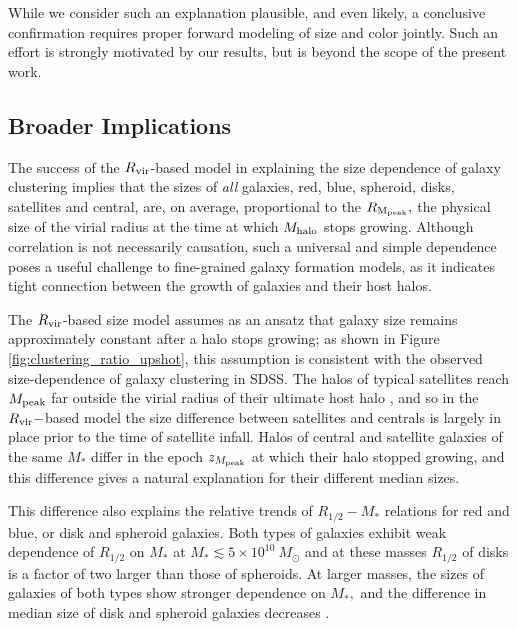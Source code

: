 \documentclass[usenatbib,usegraphicx,letterpaper]{mn2e}
\newcommand{\rhalf}{R_{1/2}}
\newcommand{\mstar}{M_{\ast}}
\newcommand{\mpeak}{M_{\rm peak}}
\newcommand{\zpeak}{z_{M_{\rm peak}}}
\newcommand{\mhalo}{M_{\rm halo}}
\newcommand{\rvir}{R_{\rm vir}}
\newcommand{\rmpeak}{R_{\rm M_{peak}}}
\begin{document}
While we consider such an explanation plausible, and even likely, a conclusive confirmation requires proper forward modeling of size and color jointly. Such an effort is strongly motivated by our results, but is beyond the scope of the present work.

\subsection{Broader Implications}
\label{subsec:broader_implications}

The success of the $\rvir$-based model in explaining the size dependence of galaxy clustering implies that the sizes of {\it all} galaxies,  red, blue, spheroid, disks, satellites and central, are, on average, proportional to the $\rmpeak,$ the physical size of the virial radius at the time at which $\mhalo$ stops growing. Although correlation is not necessarily causation, such a universal and simple dependence poses a useful challenge to fine-grained galaxy formation models, as it indicates tight connection between the growth of galaxies and their host halos.

The $\rvir$-based size model assumes as an ansatz that galaxy size remains approximately constant after a halo stops growing; as shown in Figure \ref{fig:clustering_ratio_upshot}, this assumption is consistent with the observed size-dependence of galaxy clustering in SDSS.  The halos of typical satellites reach $\mpeak$ far outside the virial radius of their ultimate host halo \citep{behroozi_etal14}, and so in the $\rvir-$based model the size difference between satellites and centrals is largely in place prior to the time of satellite infall. Halos of central and satellite galaxies of the same $\mstar$ differ in the epoch $\zpeak$ at which their halo stopped growing, and this difference gives a natural explanation for their different median sizes.

This difference also explains the relative trends of $\rhalf-\mstar$ relations for red and blue, or disk and spheroid galaxies.
Both types of galaxies exhibit weak dependence of $\rhalf$ on $\mstar$ at $\mstar\lesssim 5\times 10^{10}\ M_\odot$ and
at these masses $\rhalf$ of disks is a factor of two larger than those of spheroids. At larger masses, the sizes of galaxies of both types show stronger dependence on $\mstar,$ and the difference in median size of disk and spheroid galaxies decreases \citep[e.g.,][]{bernardi_etal14}.
\end{document}

